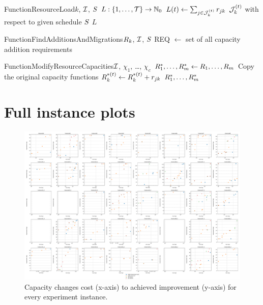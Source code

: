\begin{alg}{Function}{ResourceLoad}{$k$, $\mathcal{I}$, $S$} \label{alg:resource-load}
\State $L : \{{1}, \dots, {\mathcal{T}}\} \to \mathbb{N}_0$
    \State $L(t) \gets \sum_{j \in \mathcal{J}_{k}^{(t)}} r_{j k}$
        \Comment $\mathcal{J}_{k}^{(t)}$ with respect to given schedule $S$
\EndFor
\State \Return $L$
\end{alg}


\begin{alg}{Function}{FindAdditionsAndMigrations}{$R_{k}$, $\mathcal{I}$, $S$} \label{alg:find-additions-and-migrations}
\State REQ $\gets$ set of all capacity addition requirements
\State 
\end{alg}


\begin{alg}{Function}{ModifyResourceCapacities}{$\mathcal{I}$, $\chi_1$, \dots, $\chi_c$} \label{alg:modify-resource-capacities}
\State $R_{1}^*, \dots, R_{m}^* \gets R_{1}, \dots, R_{m}$
    \Comment Copy the original capacity functions
            \State $\capacity{k}{t}^* \gets \capacity{k}{t}^* + \consumption{j}{k}$
        \EndFor
    \EndFor
\EndFor
\State \Return $R_{1}^*, \ldots, R_{m}^*$
\end{alg}

\section{Full instance plots} \label{sec:attachments/full-instance-plots}

\begin{figure}
    \centering
    \includegraphics[angle=270, width=\textwidth]{img/exp_cost_improv.pdf}
    \caption{
        Capacity changes cost (x-axis) to achieved 
        improvement (y-axis) for every experiment instance.
        }
    \label{fig:exp-full/cost-improv}
\end{figure}

